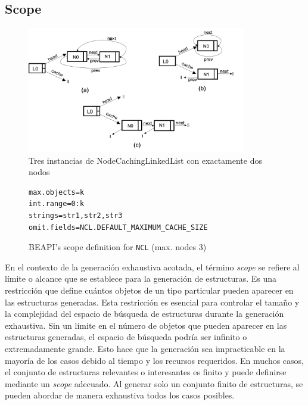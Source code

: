 \subsection{Scope}

\label{sec:scope}

\begin{figure}[H]
    \centering
    \includegraphics[width=0.85\textwidth]{images/NCL-instances.png}
    \caption{Tres instancias de NodeCachingLinkedList con exactamente dos nodos}
    \label{fig:ncl-instances}
\end{figure}

\begin{figure}[H]
\begin{lstlisting}[keywordstyle=\scriptsize\ttfamily]
max.objects=k
int.range=0:k
strings=str1,str2,str3
omit.fields=NCL.DEFAULT_MAXIMUM_CACHE_SIZE
\end{lstlisting}
\caption{\textsf{BEAPI}'s scope definition for \texttt{NCL} (max. nodes 3)}
\label{fig:NCL-fin-BEAPI}
\end{figure}

En el contexto de la generación exhaustiva acotada, el término \emph{scope} se refiere al límite o alcance que se establece para la generación de estructuras. Es una restricción que define cuántos objetos de un tipo particular pueden aparecer en las estructuras generadas. Esta restricción es esencial para controlar el tamaño y la complejidad del espacio de búsqueda de estructuras durante la generación exhaustiva. Sin un límite en el número de objetos que pueden aparecer en las estructuras generadas, el espacio de búsqueda podría ser infinito o extremadamente grande. Esto hace que la generación sea impracticable en la mayoría de los casos debido al tiempo y los recursos requeridos.  En muchos casos, el conjunto de estructuras relevantes o interesantes es finito y puede definirse mediante un \emph{scope} adecuado. Al generar solo un conjunto finito de estructuras, se pueden abordar de manera exhaustiva todos los casos posibles.

